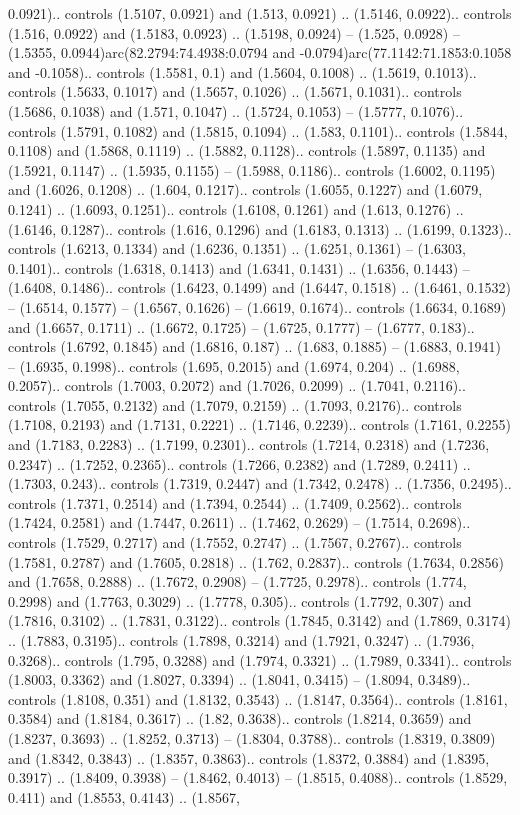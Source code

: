 0.0921).. controls (1.5107, 0.0921) and (1.513, 0.0921) .. (1.5146, 0.0922).. controls (1.516, 0.0922) and (1.5183, 0.0923) .. (1.5198, 0.0924) -- (1.525, 0.0928) -- (1.5355, 0.0944)arc(82.2794:74.4938:0.0794 and -0.0794)arc(77.1142:71.1853:0.1058 and -0.1058).. controls (1.5581, 0.1) and (1.5604, 0.1008) .. (1.5619, 0.1013).. controls (1.5633, 0.1017) and (1.5657, 0.1026) .. (1.5671, 0.1031).. controls (1.5686, 0.1038) and (1.571, 0.1047) .. (1.5724, 0.1053) -- (1.5777, 0.1076).. controls (1.5791, 0.1082) and (1.5815, 0.1094) .. (1.583, 0.1101).. controls (1.5844, 0.1108) and (1.5868, 0.1119) .. (1.5882, 0.1128).. controls (1.5897, 0.1135) and (1.5921, 0.1147) .. (1.5935, 0.1155) -- (1.5988, 0.1186).. controls (1.6002, 0.1195) and (1.6026, 0.1208) .. (1.604, 0.1217).. controls (1.6055, 0.1227) and (1.6079, 0.1241) .. (1.6093, 0.1251).. controls (1.6108, 0.1261) and (1.613, 0.1276) .. (1.6146, 0.1287).. controls (1.616, 0.1296) and (1.6183, 0.1313) .. (1.6199, 0.1323).. controls (1.6213, 0.1334) and (1.6236, 0.1351) .. (1.6251, 0.1361) -- (1.6303, 0.1401).. controls (1.6318, 0.1413) and (1.6341, 0.1431) .. (1.6356, 0.1443) -- (1.6408, 0.1486).. controls (1.6423, 0.1499) and (1.6447, 0.1518) .. (1.6461, 0.1532) -- (1.6514, 0.1577) -- (1.6567, 0.1626) -- (1.6619, 0.1674).. controls (1.6634, 0.1689) and (1.6657, 0.1711) .. (1.6672, 0.1725) -- (1.6725, 0.1777) -- (1.6777, 0.183).. controls (1.6792, 0.1845) and (1.6816, 0.187) .. (1.683, 0.1885) -- (1.6883, 0.1941) -- (1.6935, 0.1998).. controls (1.695, 0.2015) and (1.6974, 0.204) .. (1.6988, 0.2057).. controls (1.7003, 0.2072) and (1.7026, 0.2099) .. (1.7041, 0.2116).. controls (1.7055, 0.2132) and (1.7079, 0.2159) .. (1.7093, 0.2176).. controls (1.7108, 0.2193) and (1.7131, 0.2221) .. (1.7146, 0.2239).. controls (1.7161, 0.2255) and (1.7183, 0.2283) .. (1.7199, 0.2301).. controls (1.7214, 0.2318) and (1.7236, 0.2347) .. (1.7252, 0.2365).. controls (1.7266, 0.2382) and (1.7289, 0.2411) .. (1.7303, 0.243).. controls (1.7319, 0.2447) and (1.7342, 0.2478) .. (1.7356, 0.2495).. controls (1.7371, 0.2514) and (1.7394, 0.2544) .. (1.7409, 0.2562).. controls (1.7424, 0.2581) and (1.7447, 0.2611) .. (1.7462, 0.2629) -- (1.7514, 0.2698).. controls (1.7529, 0.2717) and (1.7552, 0.2747) .. (1.7567, 0.2767).. controls (1.7581, 0.2787) and (1.7605, 0.2818) .. (1.762, 0.2837).. controls (1.7634, 0.2856) and (1.7658, 0.2888) .. (1.7672, 0.2908) -- (1.7725, 0.2978).. controls (1.774, 0.2998) and (1.7763, 0.3029) .. (1.7778, 0.305).. controls (1.7792, 0.307) and (1.7816, 0.3102) .. (1.7831, 0.3122).. controls (1.7845, 0.3142) and (1.7869, 0.3174) .. (1.7883, 0.3195).. controls (1.7898, 0.3214) and (1.7921, 0.3247) .. (1.7936, 0.3268).. controls (1.795, 0.3288) and (1.7974, 0.3321) .. (1.7989, 0.3341).. controls (1.8003, 0.3362) and (1.8027, 0.3394) .. (1.8041, 0.3415) -- (1.8094, 0.3489).. controls (1.8108, 0.351) and (1.8132, 0.3543) .. (1.8147, 0.3564).. controls (1.8161, 0.3584) and (1.8184, 0.3617) .. (1.82, 0.3638).. controls (1.8214, 0.3659) and (1.8237, 0.3693) .. (1.8252, 0.3713) -- (1.8304, 0.3788).. controls (1.8319, 0.3809) and (1.8342, 0.3843) .. (1.8357, 0.3863).. controls (1.8372, 0.3884) and (1.8395, 0.3917) .. (1.8409, 0.3938) -- (1.8462, 0.4013) -- (1.8515, 0.4088).. controls (1.8529, 0.411) and (1.8553, 0.4143) .. (1.8567, 